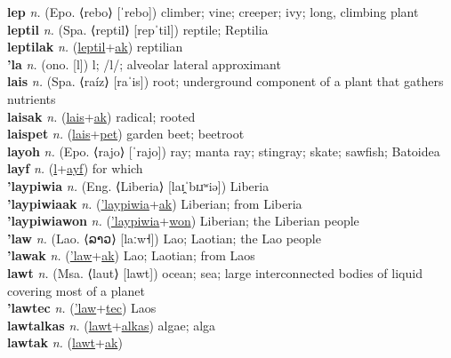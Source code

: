 \textbf{lep} \textit{n.} (Epo. ⟨rebo⟩ [ˈrebo])
climber; vine; creeper; ivy; long, climbing plant \label{lep} \\
\textbf{leptil} \textit{n.} (Spa. ⟨reptil⟩ [repˈtil])
reptile; Reptilia \label{leptil} \\
\textbf{leptilak} \textit{n.} (\hyperref[leptil]{leptil}+\hyperref[ak]{ak})
reptilian \label{leptilak} \\
\textbf{'la} \textit{n.} (ono. [l])
l; /l/; alveolar lateral approximant \label{'la} \\
\textbf{lais} \textit{n.} (Spa. ⟨raíz⟩ [raˈis])
root; underground component of a plant that gathers nutrients \label{lais} \\
\textbf{laisak} \textit{n.} (\hyperref[lais]{lais}+\hyperref[ak]{ak})
radical; rooted \label{laisak} \\
\textbf{laispet} \textit{n.} (\hyperref[lais]{lais}+\hyperref[pet]{pet})
garden beet; beetroot \label{laispet} \\
\textbf{layoh} \textit{n.} (Epo. ⟨rajo⟩ [ˈrajo])
ray; manta ray; stingray; skate; sawfish; Batoidea \label{layoh} \\
\textbf{layf} \textit{n.} (\hyperref[l]{l}+\hyperref[yf]{ayf})
for which \label{layf} \\
\textbf{'laypiwia} \textit{n.} (Eng. ⟨Liberia⟩ [laɪ̯ˈbɪɹʷiə])
Liberia \label{'laypiwia} \\
\textbf{'laypiwiaak} \textit{n.} (\hyperref['laypiwia]{'laypiwia}+\hyperref[ak]{ak})
Liberian; from Liberia \label{'laypiwiaak} \\
\textbf{'laypiwiawon} \textit{n.} (\hyperref['laypiwia]{'laypiwia}+\hyperref[won]{won})
Liberian; the Liberian people \label{'laypiwiawon} \\
\textbf{'law} \textit{n.} (Lao. ⟨ລາວ⟩ [laːw˧])
Lao; Laotian; the Lao people \label{'law} \\
\textbf{'lawak} \textit{n.} (\hyperref['law]{'law}+\hyperref[ak]{ak})
Lao; Laotian; from Laos \label{'lawak} \\
\textbf{lawt} \textit{n.} (Msa. ⟨laut⟩ [lawt])
ocean; sea; large interconnected bodies of liquid covering most of a planet \label{lawt} \\
\textbf{'lawtec} \textit{n.} (\hyperref['law]{'law}+\hyperref[tec]{tec})
Laos \label{'lawtec} \\
\textbf{lawtalkas} \textit{n.} (\hyperref[lawt]{lawt}+\hyperref[alkas]{alkas})
algae; alga \label{lawtalkas} \\
\textbf{lawtak} \textit{n.} (\hyperref[lawt]{lawt}+\hyperref[ak]{ak})

